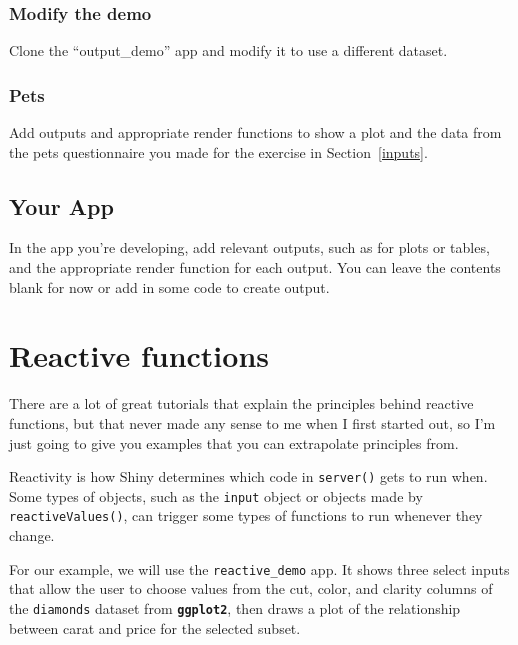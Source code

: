 \documentclass[
  oneside]{book}
\begin{document}
\hypertarget{modify-the-demo}{%
\subsection{Modify the demo}\label{modify-the-demo}}

Clone the ``output\_demo'' app and modify it to use a different dataset.

\hypertarget{pets-1}{%
\subsection{Pets}\label{pets-1}}

Add outputs and appropriate render functions to show a plot and the data from the pets questionnaire you made for the exercise in Section~\ref{inputs}.

\hypertarget{your-app-outputs}{%
\section{Your App}\label{your-app-outputs}}

In the app you're developing, add relevant outputs, such as for plots or tables, and the appropriate render function for each output. You can leave the contents blank for now or add in some code to create output.

\hypertarget{reactives}{%
\chapter{Reactive functions}\label{reactives}}

There are a lot of great tutorials that explain the principles behind reactive functions, but that never made any sense to me when I first started out, so I'm just going to give you examples that you can extrapolate principles from.

Reactivity is how Shiny determines which code in \texttt{server}\texttt{()} gets to run when. Some types of objects, such as the \texttt{input} object or objects made by \texttt{reactiveValues}\texttt{()}, can trigger some types of functions to run whenever they change.

For our example, we will use the \texttt{reactive\_demo} app. It shows three select inputs that allow the user to choose values from the cut, color, and clarity columns of the \texttt{diamonds} dataset from \textbf{\texttt{ggplot2}}, then draws a plot of the relationship between carat and price for the selected subset.
\end{document}
